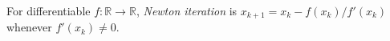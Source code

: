 
For differentiable $f:\mathbb R\to\mathbb R$, \emph{Newton iteration} is $x_{k+1}=x_k-f(x_k)/f'(x_k)$ whenever $f'(x_k)\ne0$.
